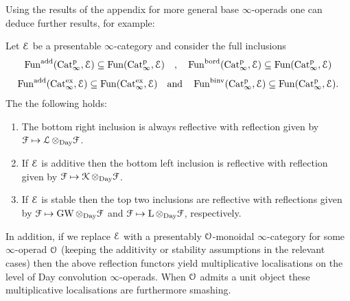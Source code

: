 Using the results of the appendix for more general base $\infty$-operads 
one can deduce further results, for example:

\begin{corollary}
\label{corollary:multgw}%
Let $\mathcal{E}$ be a presentable $\infty$-category and consider the full inclusions
\[
\operatorname{Fun}^{\mathrm{add}}(\mathrm{Cat}^{\mathrm p}_\infty,\mathcal{E}) \subseteq \operatorname{Fun}(\mathrm{Cat}^{\mathrm p}_\infty,\mathcal{E}) \quad ,\quad \operatorname{Fun}^{\mathrm{bord}}(\mathrm{Cat}^{\mathrm p}_\infty,\mathcal{E}) \subseteq \operatorname{Fun}(\mathrm{Cat}^{\mathrm p}_\infty,\mathcal{E})
\]
\[
\operatorname{Fun}^{\mathrm{add}}(\mathrm{Cat}_\infty^{\mathrm{ex}},\mathcal{E}) \subseteq \operatorname{Fun}(\mathrm{Cat}_\infty^{\mathrm{ex}},\mathcal{E}) \quad \text{and} \quad \operatorname{Fun}^{\mathrm{binv}}(\mathrm{Cat}^{\mathrm p}_\infty,\mathcal{E}) \subseteq \operatorname{Fun}(\mathrm{Cat}^{\mathrm p}_\infty,\mathcal{E}).
\]
The the following holds:
\begin{enumerate}
\item
The bottom right inclusion is always reflective with reflection given by $\mathcal{F} \mapsto \operatorname{\mathcal{L}} \otimes_{\mathrm{Day}} \mathcal{F}$.
\item
If $\mathcal{E}$ is additive then the bottom left inclusion is reflective with reflection given by $\mathcal{F} \mapsto \operatorname{\mathcal{K}} \otimes_{\mathrm{Day}} \mathcal{F}$.
\item 
If $\mathcal{E}$ is stable then the top two inclusions are reflective with reflections given by $\mathcal{F} \mapsto \operatorname{GW} \otimes_{\mathrm{Day}} \mathcal{F}$ and $\mathcal{F} \mapsto \operatorname L \otimes_{\mathrm{Day}} \mathcal{F}$, respectively.
\end{enumerate}
In addition, if we replace $\mathcal{E}$ with a presentably $\mathcal{O}$-monoidal $\infty$-category for some $\infty$-operad $\mathcal{O}$ (keeping the additivity or stability assumptions in the relevant cases) then the above reflection functors yield multiplicative localisations on the level of Day convolution $\infty$-operads. When $\mathcal{O}$ admits a unit object these multiplicative localisations are furthermore smashing.
\end{corollary}


